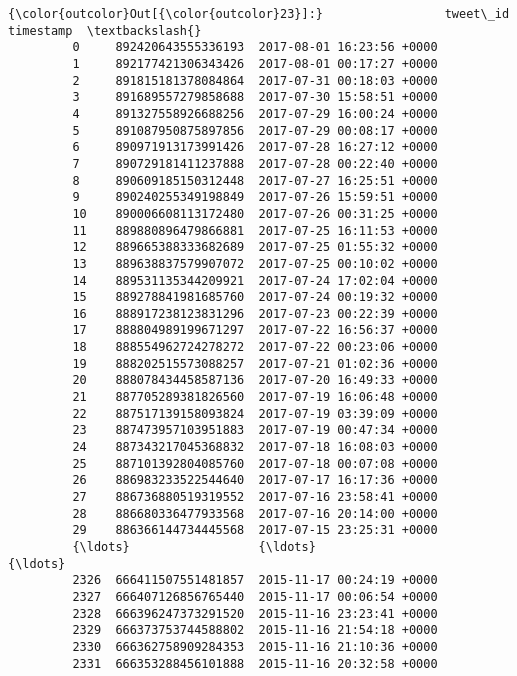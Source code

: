 \documentclass[11pt]{article}
\begin{document}
\begin{Verbatim}[commandchars=\\\{\}]
{\color{outcolor}Out[{\color{outcolor}23}]:}                 tweet\_id                  timestamp  \textbackslash{}
         0     892420643555336193  2017-08-01 16:23:56 +0000   
         1     892177421306343426  2017-08-01 00:17:27 +0000   
         2     891815181378084864  2017-07-31 00:18:03 +0000   
         3     891689557279858688  2017-07-30 15:58:51 +0000   
         4     891327558926688256  2017-07-29 16:00:24 +0000   
         5     891087950875897856  2017-07-29 00:08:17 +0000   
         6     890971913173991426  2017-07-28 16:27:12 +0000   
         7     890729181411237888  2017-07-28 00:22:40 +0000   
         8     890609185150312448  2017-07-27 16:25:51 +0000   
         9     890240255349198849  2017-07-26 15:59:51 +0000   
         10    890006608113172480  2017-07-26 00:31:25 +0000   
         11    889880896479866881  2017-07-25 16:11:53 +0000   
         12    889665388333682689  2017-07-25 01:55:32 +0000   
         13    889638837579907072  2017-07-25 00:10:02 +0000   
         14    889531135344209921  2017-07-24 17:02:04 +0000   
         15    889278841981685760  2017-07-24 00:19:32 +0000   
         16    888917238123831296  2017-07-23 00:22:39 +0000   
         17    888804989199671297  2017-07-22 16:56:37 +0000   
         18    888554962724278272  2017-07-22 00:23:06 +0000   
         19    888202515573088257  2017-07-21 01:02:36 +0000   
         20    888078434458587136  2017-07-20 16:49:33 +0000   
         21    887705289381826560  2017-07-19 16:06:48 +0000   
         22    887517139158093824  2017-07-19 03:39:09 +0000   
         23    887473957103951883  2017-07-19 00:47:34 +0000   
         24    887343217045368832  2017-07-18 16:08:03 +0000   
         25    887101392804085760  2017-07-18 00:07:08 +0000   
         26    886983233522544640  2017-07-17 16:17:36 +0000   
         27    886736880519319552  2017-07-16 23:58:41 +0000   
         28    886680336477933568  2017-07-16 20:14:00 +0000   
         29    886366144734445568  2017-07-15 23:25:31 +0000   
         {\ldots}                  {\ldots}                        {\ldots}   
         2326  666411507551481857  2015-11-17 00:24:19 +0000   
         2327  666407126856765440  2015-11-17 00:06:54 +0000   
         2328  666396247373291520  2015-11-16 23:23:41 +0000   
         2329  666373753744588802  2015-11-16 21:54:18 +0000   
         2330  666362758909284353  2015-11-16 21:10:36 +0000   
         2331  666353288456101888  2015-11-16 20:32:58 +0000   

\end{Verbatim}
\end{document}
